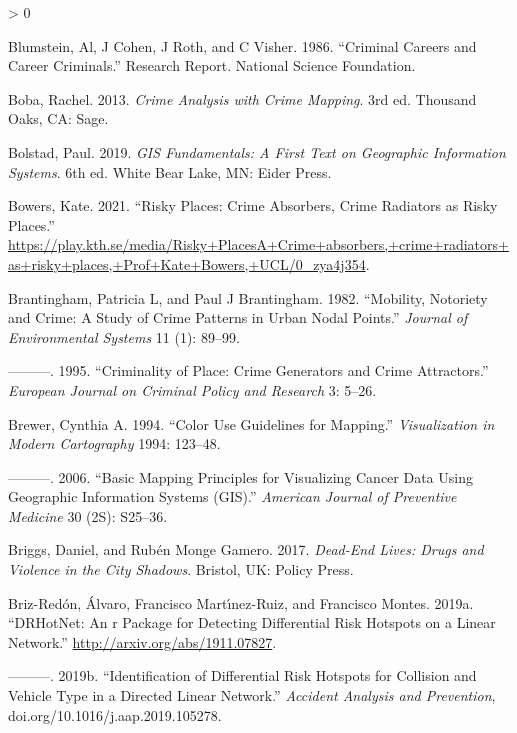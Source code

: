 \documentclass[
  krantz2]{krantz}
\newlength{\cslhangindent}
\newenvironment{CSLReferences}[2] %
 {%
  \setlength{\parindent}{0pt}
  \ifodd #1 \everypar{\setlength{\hangindent}{\cslhangindent}}\ignorespaces\fi
  \ifnum #2 > 0
  \setlength{\parskip}{#2\baselineskip}
  \fi
 }%
 {}
\begin{document}
\begin{CSLReferences}{1}{0}
\leavevmode\hypertarget{ref-Blumstein_1986}{}%
Blumstein, Al, J Cohen, J Roth, and C Visher. 1986. {``Criminal Careers and Career Criminals.''} Research Report. National Science Foundation.

\leavevmode\hypertarget{ref-Boba_2013}{}%
Boba, Rachel. 2013. \emph{Crime Analysis with Crime Mapping}. 3rd ed. Thousand Oaks, CA: Sage.

\leavevmode\hypertarget{ref-Bolstad_2019}{}%
Bolstad, Paul. 2019. \emph{GIS Fundamentals: A First Text on Geographic Information Systems}. 6th ed. White Bear Lake, MN: Eider Press.

\leavevmode\hypertarget{ref-Bowers_2021}{}%
Bowers, Kate. 2021. {``Risky Places: Crime Absorbers, Crime Radiators as Risky Places.''} \url{https://play.kth.se/media/Risky+PlacesA+Crime+absorbers,+crime+radiators+as+risky+places,+Prof+Kate+Bowers,+UCL/0_zya4j354}.

\leavevmode\hypertarget{ref-Brantingham_1982}{}%
Brantingham, Patricia L, and Paul J Brantingham. 1982. {``Mobility, Notoriety and Crime: A Study of Crime Patterns in Urban Nodal Points.''} \emph{Journal of Environmental Systems} 11 (1): 89--99.

\leavevmode\hypertarget{ref-Brantingham_1995}{}%
---------. 1995. {``Criminality of Place: Crime Generators and Crime Attractors.''} \emph{European Journal on Criminal Policy and Research} 3: 5--26.

\leavevmode\hypertarget{ref-Brewer_1994}{}%
Brewer, Cynthia A. 1994. {``Color Use Guidelines for Mapping.''} \emph{Visualization in Modern Cartography} 1994: 123--48.

\leavevmode\hypertarget{ref-Brewer_2006}{}%
---------. 2006. {``Basic Mapping Principles for Visualizing Cancer Data Using Geographic Information Systems (GIS).''} \emph{American Journal of Preventive Medicine} 30 (2S): S25--36.

\leavevmode\hypertarget{ref-Briggs_2017}{}%
Briggs, Daniel, and Rubén Monge Gamero. 2017. \emph{Dead-End Lives: Drugs and Violence in the City Shadows}. Bristol, UK: Policy Press.

\leavevmode\hypertarget{ref-BrizRedon_2019a}{}%
Briz-Redón, Álvaro, Francisco Martı́nez-Ruiz, and Francisco Montes. 2019a. {``DRHotNet: An r Package for Detecting Differential Risk Hotspots on a Linear Network.''} \url{http://arxiv.org/abs/1911.07827}.

\leavevmode\hypertarget{ref-BrizRedon_2019b}{}%
---------. 2019b. {``Identification of Differential Risk Hotspots for Collision and Vehicle Type in a Directed Linear Network.''} \emph{Accident Analysis and Prevention}, doi.org/10.1016/j.aap.2019.105278.


\end{CSLReferences}
\end{document}
